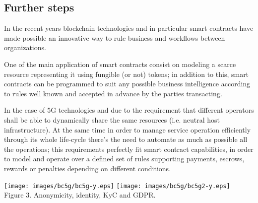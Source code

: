 \documentclass[12pt]{amsart}
\begin{document}
\begin{multicols}{2}
\section{Further steps}

\vspace{0.35cm}

In the recent years blockchain technologies
and in particular smart contracts have made possible
an innovative way to rule business and
workflows between organizations.

\vspace{0.35cm}

One of the main application of smart contracts
consist on modeling a scarce resource representing
it using fungible (or not) tokens; in addition
to this, smart contracts can be programmed
to suit any possible business intelligence
according to rules well known and accepted
in advance by the parties transacting.

\vspace{0.35cm}

In the case of 5G technologies and due to the
requirement that different operators shall be able
to dynamically share the same resources (i.e. neutral host
infrastructure). At the same time in order to manage
service operation efficiently through its whole
life-cycle there's the need to automate as much as
possible all the operations; this requirements
perfectly fit smart contract capabilities, in order
to model and operate over a defined set of rules
supporting payments, escrows, rewards or penalties
depending on different conditions.

\end{multicols}
\begin{center}
  \texttt{[image: images/bc5g/bc5g-y.eps]}
  \texttt{[image: images/bc5g/bc5g2-y.eps]}
\\
Figure 3. Anonymicity, identity, KyC and GDPR.
\\
\end{center}
\begin{multicols}{2}

\end{multicols}
\end{document}
